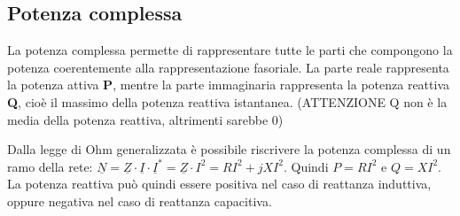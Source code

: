 \documentclass{article}
\begin{document}
\subsection{Potenza complessa}

\medskip
\noindent{}
\medskip

\noindent La potenza complessa permette di rappresentare tutte le parti che compongono la potenza coerentemente alla rappresentazione 
fasoriale. La parte reale rappresenta la potenza attiva \textbf{P}, mentre la parte immaginaria rappresenta la potenza reattiva \textbf{Q},
cioè il massimo della potenza reattiva istantanea. (ATTENZIONE Q non è la media della potenza reattiva, altrimenti sarebbe 0)
\medskip

\noindent Dalla legge di Ohm generalizzata è possibile riscrivere la potenza complessa di un ramo della rete:
$\underline{N}=\underline{Z}\cdot\underline{I}\cdot\underline{I}^*=\underline{Z}\cdot I^2=RI^2+jXI^2$. Quindi $P=RI^2$ e $Q=XI^2$.
La potenza reattiva può quindi essere positiva nel caso di reattanza induttiva, oppure negativa nel caso di reattanza capacitiva.

\medskip
\noindent{}
\medskip
\end{document}
